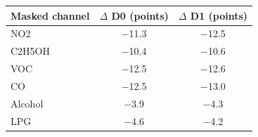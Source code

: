 \begin{tabular}{lcc}
\toprule
\textbf{Masked channel} & \textbf{$\Delta$ D0 (points)} & \textbf{$\Delta$ D1 (points)} \\
\midrule
NO2 & $-$11.3 & $-$12.5 \\
C2H5OH & $-$10.4 & $-$10.6 \\
VOC & $-$12.5 & $-$12.6 \\
CO & $-$12.5 & $-$13.0 \\
Alcohol & $-$3.9 & $-$4.3 \\
LPG & $-$4.6 & $-$4.2 \\
\bottomrule
\end{tabular}
